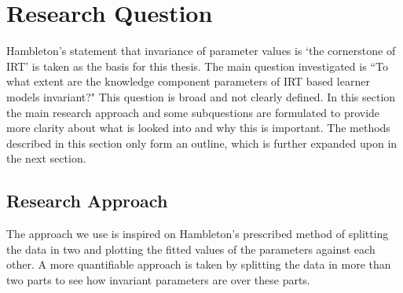 \documentclass{scrartcl}
\begin{document}

\section{Research Question}
\label{sec:RQ}
Hambleton's statement that invariance of parameter values is `the cornerstone of IRT' is taken as the basis for this thesis. The main question investigated is ``To what extent are the knowledge component parameters of IRT based learner models invariant?" This question is broad and not clearly defined. In this section the main research approach and some subquestions are formulated to provide more clarity about what is looked into and why this is important. The methods described in this section only form an outline, which is further expanded upon in the next section.


\subsection{Research Approach}
The approach we use is inspired on Hambleton's prescribed method of splitting the data in two and plotting the fitted values of the parameters against each other. A more quantifiable approach is taken by splitting the data in more than two parts to see how invariant parameters are over these parts.
\end{document}
